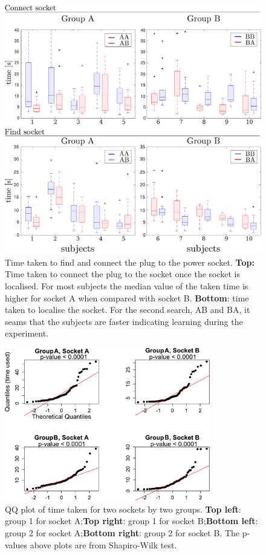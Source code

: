 \begin{figure}
 \centering
 \includegraphics[width=\textwidth]{./ch4-PiH/Figures/time_taken_subgroup.pdf}
 \caption{Time taken to find and connect the plug to the power socket. \textbf{Top:} 
 Time taken to connect the plug to the socket once the socket is localised. For most subjects the median value of the taken time is higher 
 for socket A when compared with socket B. \textbf{Bottom}: time taken to localise the socket. For the second
 search, AB and BA, it seams that the subjects are faster indicating learning during the experiment.
 }
 \label{figuretimesubject}
\end{figure}

\begin{figure}
   \includegraphics[width=0.8\textwidth]{./ch4-PiH/Figures/QQplot.pdf}
   \caption{QQ plot of time taken for two sockets by two groups. \textbf{Top left}: group 1 for socket A;\textbf{Top right}: group 1 for socket B;\textbf{Bottom left}: group 2 for socket A;\textbf{Bottom right}: group 2 for socket B. The p-values above plots are from Shapiro-Wilk test.}
   \label{QQplot}
\end{figure}


